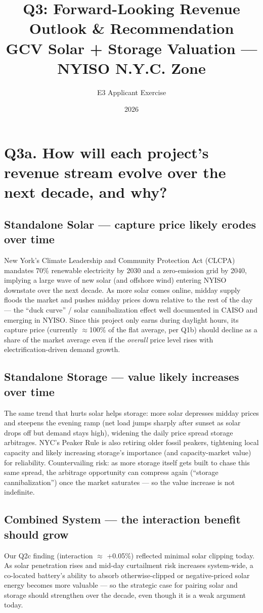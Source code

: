 \documentclass[11pt]{article}
\title{\textbf{Q3: Forward-Looking Revenue Outlook \& Recommendation}\\
\large GCV Solar + Storage Valuation --- NYISO N.Y.C. Zone}
\author{E3 Applicant Exercise}
\date{2026}
\begin{document}
\maketitle

\section*{Q3a. How will each project's revenue stream evolve over the next decade, and why?}

\subsection*{Standalone Solar --- capture price likely erodes over time}
New York's Climate Leadership and Community Protection Act (CLCPA) mandates 70\% renewable
electricity by 2030 and a zero-emission grid by 2040, implying a large wave of new solar (and
offshore wind) entering NYISO downstate over the next decade. As more solar comes online, midday
supply floods the market and pushes midday prices down relative to the rest of the day --- the
``duck curve'' / solar cannibalization effect well documented in CAISO and emerging in NYISO.
Since this project only earns during daylight hours, its capture price (currently $\approx$100\%
of the flat average, per Q1b) should decline as a share of the market average even if the
\emph{overall} price level rises with electrification-driven demand growth.

\subsection*{Standalone Storage --- value likely increases over time}
The same trend that hurts solar helps storage: more solar depresses midday prices and steepens
the evening ramp (net load jumps sharply after sunset as solar drops off but demand stays high),
widening the daily price spread storage arbitrages. NYC's Peaker Rule is also retiring older
fossil peakers, tightening local capacity and likely increasing storage's importance (and
capacity-market value) for reliability. Countervailing risk: as more storage itself gets built to
chase this same spread, the arbitrage opportunity can compress again (``storage cannibalization'')
once the market saturates --- so the value increase is not indefinite.

\subsection*{Combined System --- the interaction benefit should grow}
Our Q2c finding (interaction $\approx$ +0.05\%) reflected minimal solar clipping today. As solar
penetration rises and mid-day curtailment risk increases system-wide, a co-located battery's
ability to absorb otherwise-clipped or negative-priced solar energy becomes more valuable --- so
the strategic case for pairing solar and storage should strengthen over the decade, even though
it is a weak argument today.
\end{document}
